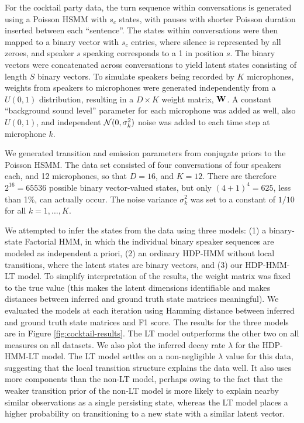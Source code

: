 For the cocktail party data, the turn sequence within conversations is
generated using a Poisson HSMM with $s_c$ states, with pauses with
shorter Poisson duration inserted between each ``sentence''.  The
states within conversations were then mapped to a binary vector with
$s_c$ entries, where silence is represented by all zeroes, 
and speaker $s$ speaking corresponds to
a 1 in position $s$.  The binary vectors were concatenated across
conversations to yield latent states consisting of length $S$ binary
vectors.  To simulate speakers being recorded by $K$ microphones,
weights from speakers to microphones were generated independently from
a $U(0,1)$ distribution, resulting in a $D \times K$ weight matrix,
$\mathbf{W}$.  A constant ``background sound level'' parameter for each microphone was added as
well, also $U(0,1)$, and independent $\mathcal{N}(0,\sigma^2_k)$ noise was added
to each time step at microphone $k$.

We generated transition and emission parameters from conjugate priors
to the Poisson HSMM.  The data set
consisted of four conversations of four speakers each, and 12
microphones, so that $D = 16$, and $K = 12$.  There are therefore
$2^{16} = 65536$ possible binary vector-valued states, but only
$(4+1)^4 = 625$, less than 1\%, can actually occur.  The noise variance $\sigma^2_k$ 
was set to a constant of $1/10$ for all $k = 1, \dots, K$.

We attempted to infer the states
from the data using three models: (1) a binary-state Factorial HMM, in which the
individual binary speaker sequences are modeled as independent a
priori, (2) an ordinary HDP-HMM without local transitions, where the
latent states are binary vectors, and (3) our
HDP-HMM-LT model.  To simplify interpretation of the results, the weight matrix
was fixed to the true value (this makes the latent dimensions
identifiable and makes distances between inferred and ground truth
state matrices meaningful).  We evaluated the models at each
iteration using Hamming distance between inferred 
and ground truth state matrices and F1 score.
The results for the three models are in Figure
\ref{fig:cocktail-results}.  %
The LT model outperforms the other two on
all measures on all datasets. We also plot the inferred decay rate $\lambda$ for the
HDP-HMM-LT model.  The LT model settles on a non-negligible $\lambda$
value for this data, suggesting that the local transition structure
explains the data well.  It also uses more components than the non-LT
model, perhaps owing to the fact that the weaker transition prior of
the non-LT model is more likely to explain nearby similar observations
as a single persisting state, whereas the LT model places a higher
probability on transitioning to a new state with a similar latent vector.


